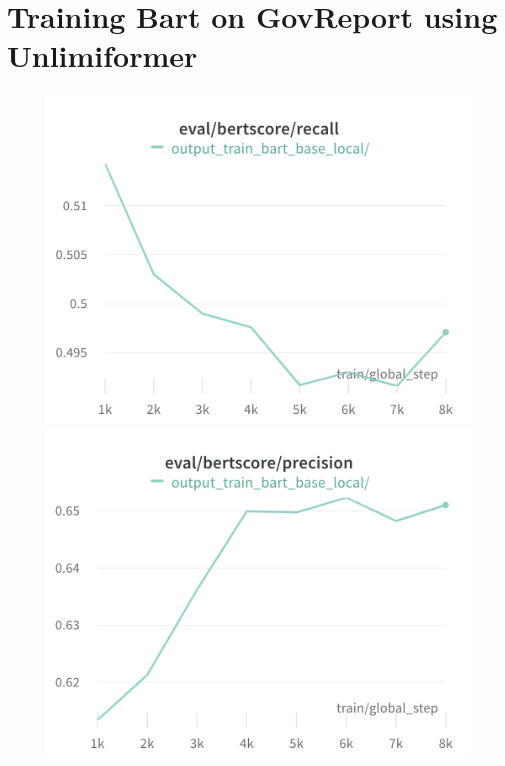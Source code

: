 \section{Training Bart on GovReport using Unlimiformer}
\label{sec-training-appendix}

\begin{figure}[!htb]
\includegraphics[width=\linewidth]{wandb/charts/Section-2-Panel-0-5gq0m8uvz}
\caption{}
\endminipage\hfill
{}
\includegraphics[width=\linewidth]{wandb/charts/Section-2-Panel-1-omp5lgv1w}
\caption{}
\endminipage
\end{figure}


